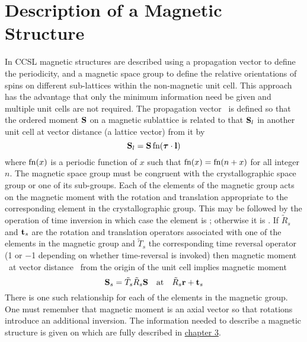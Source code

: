 %
\startdocument
\label{chap:6}
\section{Description of a Magnetic Structure}
In CCSL magnetic structures are described using a propagation vector to define  
the periodicity, and a magnetic space group to define the relative 
orientations of spins on different sub-lattices within the non-magnetic 
unit cell. This approach has the advantage that only the minimum 
information need be given and multiple unit cells are not required.
The propagation vector \pv\ is defined so that
the ordered moment $\mbox{${\bf S}$}$ on a magnetic sublattice is related to that 
${\mbox{${\bf S}$}}_l$ in 
another unit cell at vector distance \lat\space(a lattice vector) from it by
\[{\mbox{${\bf S}$}}_l= {\mbox{${\bf S}$}}\,\mbox{\rm fn}({\bm \tau}\cdot\mathbf{l})\]
where $\mbox{\rm fn}(x)$ is a periodic function of $x$ such that  
$\mbox{\rm fn}(x)=\mbox{\rm fn}(n+x)$ for
all integer $n$.\p
The magnetic space group must be congruent with the crystallographic space
group or one of its sub-groups.
Each of the elements of the magnetic group acts on the magnetic moment with 
the rotation and translation appropriate to the corresponding element in the 
crystallographic group.
This may be followed by the operation of time 
inversion in which case the element is ;
otherwise it is .\p
If $\tilde R_s$ and ${\bf t}_s$ are the rotation and translation operators
associated with one of the elements in the magnetic group and $\tilde T_s$
the corresponding time reversal operator (1 or $-$1 depending on whether 
time-reversal is invoked) then
magnetic moment 
\Sv\ at vector distance \rv\ from the origin of the unit
cell implies magnetic moment 
\[{\mbox{${\bf S}$}}_s=\tilde T_s\tilde R_s{\mbox{${\bf S}$}}\quad\mbox{at}\quad
\tilde R_s{\bf r}+{\bf t}_s\]
There is one such relationship for each of the elements in the magnetic 
group. One must
remember that magnetic moment is an axial vector so that 
rotations introduce an additional inversion.
\p
The information needed to describe a magnetic structure is given on 
which are fully described in \hyperlink{card:Q}{chapter 3}.
